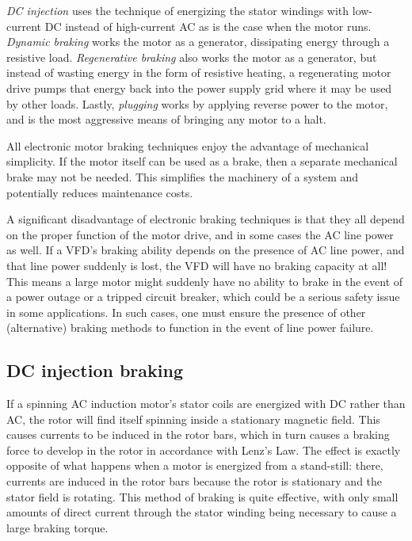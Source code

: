 \textit{DC injection} uses the technique of energizing the stator windings with low-current DC instead of high-current AC as is the case when the motor runs.  \textit{Dynamic braking} works the motor as a generator, dissipating energy through a resistive load.  \textit{Regenerative braking} also works the motor as a generator, but instead of wasting energy in the form of resistive heating, a regenerating motor drive pumps that energy back into the power supply grid where it may be used by other loads.  Lastly, \textit{plugging} works by applying reverse power to the motor, and is the most aggressive means of bringing any motor to a halt.        

\vskip 10pt

All electronic motor braking techniques enjoy the advantage of mechanical simplicity.  If the motor itself can be used as a brake, then a separate mechanical brake may not be needed.  This simplifies the machinery of a system and potentially reduces maintenance costs.

A significant disadvantage of electronic braking techniques is that they all depend on the proper function of the motor drive, and in some cases the AC line power as well.  If a VFD's braking ability depends on the presence of AC line power, and that line power suddenly is lost, the VFD will have no braking capacity at all!  This means a large motor might suddenly have no ability to brake in the event of a power outage or a tripped circuit breaker, which could be a serious safety issue in some applications.  In such cases, one must ensure the presence of other (alternative) braking methods to function in the event of line power failure.




\filbreak
\subsection{DC injection braking}

If a spinning AC induction motor's stator coils are energized with DC rather than AC, the rotor will find itself spinning inside a stationary magnetic field.  This causes currents to be induced in the rotor bars, which in turn causes a braking force to develop in the rotor in accordance with Lenz's Law.  The effect is exactly opposite of what happens when a motor is energized from a stand-still: there, currents are induced in the rotor bars because the rotor is stationary and the stator field is rotating.  This method of braking is quite effective, with only small amounts of direct current through the stator winding being necessary to cause a large braking torque.    

